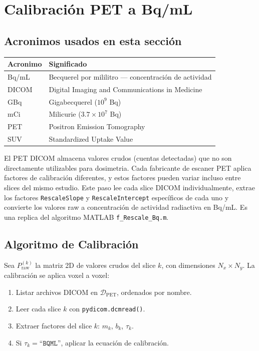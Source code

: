 \documentclass[12pt,a4paper]{article}
\begin{document}
\section{Calibración PET a Bq/mL}
\label{sec:calibracion}

\subsection*{Acronimos usados en esta sección}
\begin{tabular}{ll}
\toprule
\textbf{Acronimo} & \textbf{Significado} \\
\midrule
Bq/mL & Becquerel por mililitro --- concentración de actividad \\
DICOM & Digital Imaging and Communications in Medicine \\
GBq & Gigabecquerel ($10^9$ Bq) \\
mCi & Milicurie ($3.7 \times 10^7$ Bq) \\
PET & Positron Emission Tomography \\
SUV & Standardized Uptake Value \\
\bottomrule
\end{tabular}

El PET DICOM almacena valores crudos (cuentas detectadas) que no son directamente utilizables
para dosimetria. Cada fabricante de escaner PET aplica factores de calibración diferentes, y
estos factores pueden variar incluso entre slices del mismo estudio. Este paso lee cada slice
DICOM individualmente, extrae los factores \texttt{RescaleSlope} y \texttt{RescaleIntercept}
específicos de cada uno y convierte los valores raw a concentración de actividad radiactiva en
Bq/mL. Es una replica del algoritmo MATLAB \texttt{f\_Rescale\_Bq.m}.

\subsection{Algoritmo de Calibración}

Sea $P_{\text{raw}}^{(k)}$ la matriz 2D de valores crudos del slice $k$,
con dimensiones $N_x \times N_y$. La calibración se aplica voxel a voxel:

\begin{enumerate}
    \item Listar archivos DICOM en $\mathcal{D}_{\text{PET}}$, ordenados por nombre.
    \item Leer cada slice $k$ con \texttt{pydicom.dcmread()}.
    \item Extraer factores del slice $k$: $m_k$, $b_k$, $\tau_k$.
    \item Si $\tau_k = \texttt{``BQML''}$, aplicar la ecuación de calibración.
\end{enumerate}
\end{document}
